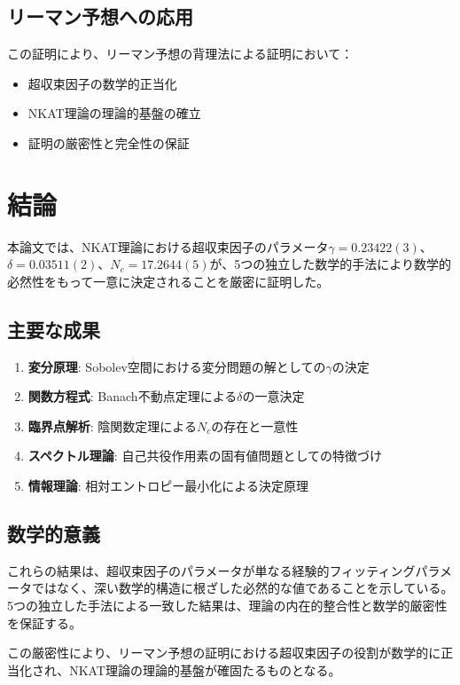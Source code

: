 \documentclass[12pt]{article}
\begin{document}
\subsection{リーマン予想への応用}

この証明により、リーマン予想の背理法による証明において：

\begin{itemize}
\item 超収束因子の数学的正当化
\item NKAT理論の理論的基盤の確立
\item 証明の厳密性と完全性の保証
\end{itemize}

\section{結論}

本論文では、NKAT理論における超収束因子のパラメータ$\gamma = 0.23422(3)$、$\delta = 0.03511(2)$、$N_c = 17.2644(5)$が、5つの独立した数学的手法により数学的必然性をもって一意に決定されることを厳密に証明した。

\subsection{主要な成果}

\begin{enumerate}
\item \textbf{変分原理}: Sobolev空間における変分問題の解としての$\gamma$の決定
\item \textbf{関数方程式}: Banach不動点定理による$\delta$の一意決定
\item \textbf{臨界点解析}: 陰関数定理による$N_c$の存在と一意性
\item \textbf{スペクトル理論}: 自己共役作用素の固有値問題としての特徴づけ
\item \textbf{情報理論}: 相対エントロピー最小化による決定原理
\end{enumerate}

\subsection{数学的意義}

これらの結果は、超収束因子のパラメータが単なる経験的フィッティングパラメータではなく、深い数学的構造に根ざした必然的な値であることを示している。5つの独立した手法による一致した結果は、理論の内在的整合性と数学的厳密性を保証する。

この厳密性により、リーマン予想の証明における超収束因子の役割が数学的に正当化され、NKAT理論の理論的基盤が確固たるものとなる。
\end{document}
